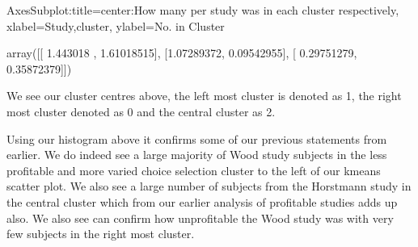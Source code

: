 \documentclass[letterpaper,10pt,english]{jupyterBook}
\begin{document}
\begin{sphinxVerbatim}[commandchars=\\\{\}]
  
   
     
\end{sphinxVerbatim}

\begin{sphinxVerbatim}[commandchars=\\\{\}]
\PYGZlt{}AxesSubplot:title=\PYGZob{}\PYGZsq{}center\PYGZsq{}:\PYGZsq{}How many per study was in each cluster respectively\PYGZsq{}\PYGZcb{}, xlabel=\PYGZsq{}Study,cluster\PYGZsq{}, ylabel=\PYGZsq{}No. in Cluster\PYGZsq{}\PYGZgt{}
\end{sphinxVerbatim}

\noindent{}

\begin{sphinxVerbatim}[commandchars=\\\{\}]
\end{sphinxVerbatim}

\begin{sphinxVerbatim}[commandchars=\\\{\}]
array([[ 1.443018  ,  1.61018515],
       [\PYGZhy{}1.07289372, \PYGZhy{}0.09542955],
       [ 0.29751279, \PYGZhy{}0.35872379]])
\end{sphinxVerbatim}

\sphinxAtStartPar
We see our cluster centres above, the left most cluster is denoted as 1, the right most cluster denoted as 0 and the central cluster as 2.

\sphinxAtStartPar
Using our histogram above it confirms some of our previous statements from earlier. We do indeed see a large majority of Wood study subjects in the less profitable and more varied choice selection cluster to the left of our k\sphinxhyphen{}means scatter plot. We also see a large number of subjects from the Horstmann study in the central cluster which from our earlier analysis of profitable studies adds up also. We also see can confirm how unprofitable the Wood study was with very few subjects in the right most cluster.
\end{document}
